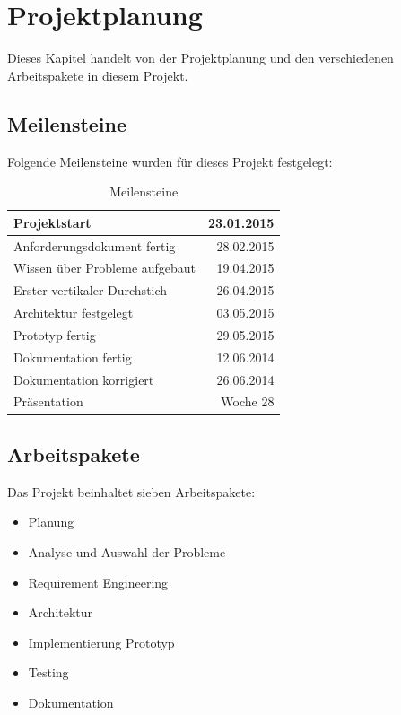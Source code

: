 %
%

\chapter{Projektplanung}\label{chap.projektplanung}
Dieses Kapitel handelt von der Projektplanung und den verschiedenen Arbeitspakete in diesem Projekt.

\section{Meilensteine}\label{meilensteine}
Folgende Meilensteine wurden für dieses Projekt festgelegt:

\begin{table}[ht]
\centering
  \begin{tabular}{ l | r }
	\hline
	\rowcolor{gray}
	\textbf{Projektstart}			&	\textbf{23.01.2015}\\ \hline
	Anforderungsdokument fertig		&	28.02.2015	\\ \hline
	Wissen über Probleme aufgebaut		&	19.04.2015	\\ \hline
	Erster vertikaler Durchstich		& 	26.04.2015	\\ \hline
	Architektur festgelegt			&	03.05.2015	\\ \hline
	Prototyp fertig				&	29.05.2015	\\ \hline
	Dokumentation fertig			&	12.06.2014	\\ \hline
	Dokumentation korrigiert			&	26.06.2014	\\ \hline
	Präsentation					&	Woche 28 \\ \hline
  \end{tabular}
   \caption{Meilensteine}\label{table:milestones}
\end{table}

\section{Arbeitspakete}\label{arbeitspakete}
Das Projekt beinhaltet sieben Arbeitspakete:
\begin{itemize}
\item Planung
\item Analyse und Auswahl der Probleme
\item Requirement Engineering
\item Architektur
\item Implementierung Prototyp
\item Testing
\item Dokumentation
\end{itemize}

